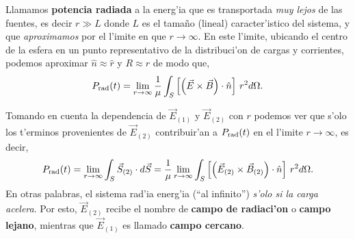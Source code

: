 Llamamos \textbf{potencia radiada} a la energ'ia que es transportada \textit{muy lejos} de las fuentes, es decir $r\gg L$ donde $L$ es el tamaño (lineal) caracter'istico del sistema, y que \textit{aproximamos} por el l'imite en que $r\rightarrow\infty$. En este l'imite, ubicando el centro de la esfera en un punto representativo de la distribuci'on de cargas y corrientes, podemos aproximar $\hat{n}\approx\hat{r}$ y $R\approx r$ de modo que,
\begin{equation}
P_{\rm rad} (t)=\lim_{r\rightarrow\infty}\frac{1}{\mu}\int_S \left[ \left(
\vec{E}\times\vec{B}\right) \cdot \hat{n}\right] \,r^2 d\Omega.
\end{equation}

Tomando en cuenta la dependencia de $\vec{E}_{(1)}$ y $\vec{E}_{(2)}$ con $r$
podemos ver que s'olo los t'erminos provenientes de $\vec{E}_{(2)}$
contribuir'an a $P_{\rm rad}(t)$ en el l'imite $r\rightarrow\infty$, es decir,
\begin{equation}\label{Pinf1}
P_{\rm rad}(t)=\lim_{r\rightarrow\infty}\int_S \vec{S}_{(2)}\cdot
d\vec{S}=\frac{1}{\mu}\lim_{r\rightarrow\infty}\int_S \left[ \left(
\vec{E}_{(2)}\times\vec{B}_{(2)}\right) \cdot \hat{n}\right] \,r^2 d\Omega.
\end{equation}
En otras palabras, el sistema rad'ia energ'ia (``al infinito'') \textit{s'olo si la
carga acelera}. Por esto, $\vec{E}_{(2)}$ recibe el nombre de \textbf{campo de
radiaci'on} o \textbf{campo lejano}, mientras que $\vec{E}_{(1)}$ es llamado
\textbf{campo cercano}.

